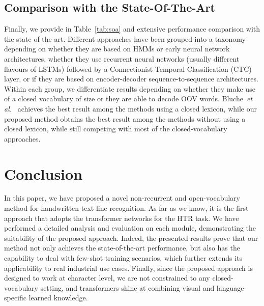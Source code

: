 \documentclass[10pt,twocolumn,letterpaper]{article}
\begin{document}
\subsection{Comparison with the State-Of-The-Art}
Finally, we provide in Table~\ref{tab:soa} and extensive performance comparison with the state of the art. Different approaches have been grouped into a taxonomy depending on whether they are based on HMMs or early neural network architectures, whether they use recurrent neural networks (usually different flavours of LSTMs) followed by a Connectionist Temporal Classification (CTC) layer, or if they are based on encoder-decoder sequence-to-sequence architectures. Within each group, we differentiate results depending on whether they make use of a closed vocabulary of size  or they are able to decode OOV words. Bluche~\emph{et al.}~\cite{bluche2017gated} achieves the best result among the methods using a closed lexicon, while our proposed method obtains the best result among the methods without using a closed lexicon, while still competing with most of the closed-vocabulary approaches.  


\section{Conclusion}
In this paper, we have proposed a novel non-recurrent and open-vocabulary method for handwritten text-line recognition. As far as we know, it is the first approach that adopts the transformer networks for the HTR task. We have performed a detailed analysis and evaluation on each module, demonstrating the suitability of the proposed approach. Indeed, the presented results prove that our method not only achieves the state-of-the-art performance, but also has the capability to deal with few-shot training scenarios, which further extends its applicability to real industrial use cases. Finally, since the proposed approach is designed to work at character level, we are not constrained to any closed-vocabulary setting, and transformers shine at combining visual and language-specific learned knowledge.



{\small


}
\end{document}
